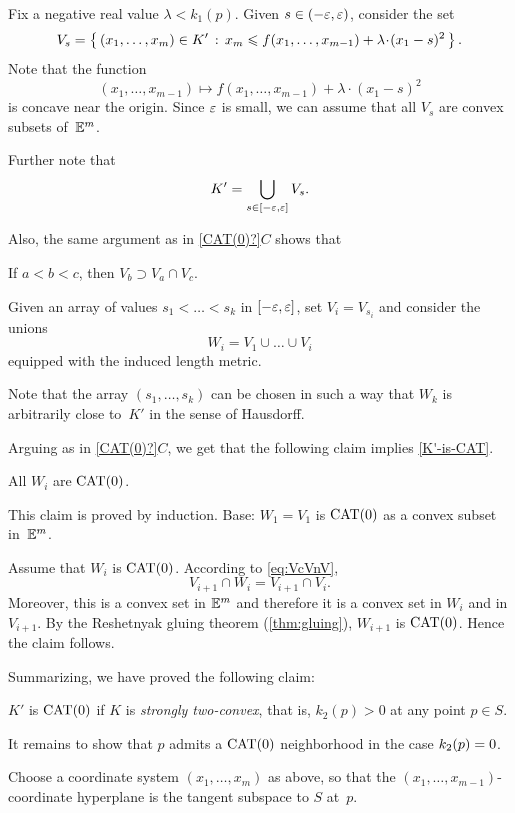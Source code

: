 Fix a negative real value $\lambda<k_1(p)$.
Given $s\in (-\varepsilon,\varepsilon)$,
consider the set 
\[V_s
=
\set
{(x_1,\ldots,x_m)\in K'}
{x_m\le f(x_1,\ldots,x_{m-1})+\lambda\cdot (x_1-s)^2}.\]
Note that the function 
\[(x_1,\ldots, x_{m-1})\mapsto f(x_1,\ldots,x_{m-1})+\lambda\cdot (x_1-s)^2\]
is concave near the origin.
Since $\varepsilon$ is small, we can assume that all $V_s$ are convex subsets of~$\mathbb{E}^m$.

Further note that 
\[K'=\bigcup_{s\in[-\varepsilon,\varepsilon]}V_s.\]

Also, the same argument as in \ref{CAT(0)?}$C$ shows that
\begin{clm}{}\label{eq:VcVnV}
If $a<b<c$, then $V_b\supset V_a\cap V_c$.

\end{clm}

Given an array of values $s_1<\ldots<s_k$ in $[-\varepsilon,\varepsilon]$,
set $V_i=V_{s_i}$ and
consider the unions 
\[W_i=V_1\cup\ldots\cup V_i\]
equipped with the induced length metric.

Note that the array $(s_1,\ldots,s_k)$ can be chosen in such a way that
$W_k$ is arbitrarily close to~$K'$ in the sense of Hausdorff.

Arguing as in \ref{CAT(0)?}$C$, we get that the following claim implies \ref{K'-is-CAT}.
\begin{clm}{}
All $W_i$ are $\mathrm{CAT}(0)$.
\end{clm}

This claim is proved by induction.
Base: $W_1=V_1$ is $\mathrm{CAT}(0)$ as a convex subset in~$\mathbb{E}^m$.

 Assume that $W_i$ is $\mathrm{CAT}(0)$.
According to \ref{eq:VcVnV}, 
\[V_{i+1}\cap W_i=V_{i+1}\cap V_i.\]
Moreover, this is a convex set in $\mathbb{E}^m$ 
and therefore it is a convex set in $W_i$ and in $V_{i+1}$.
By the Reshetnyak gluing theorem (\ref{thm:gluing}), $W_{i+1}$ is $\mathrm{CAT}(0)$.
Hence the claim follows.
\claimqeds

Summarizing, we have proved the following claim:

\begin{clm}{}\label{clm-strong2convex}
$K'$ is $\mathrm{CAT}(0)$ if $K$ is 
\emph{strongly two-convex},
that is, $k_2(p)>0$ at any point $p\in S$.
\end{clm}

It remains to show that $p$ admits a $\mathrm{CAT}(0)$ neighborhood in the case $k_2(p)\z=0$.

Choose a coordinate system $(x_1,\ldots,x_m)$ as above,
so that the $(x_1,\ldots,x_{m-1})$-coordinate hyperplane is the tangent subspace to $S$ at~$p$.

